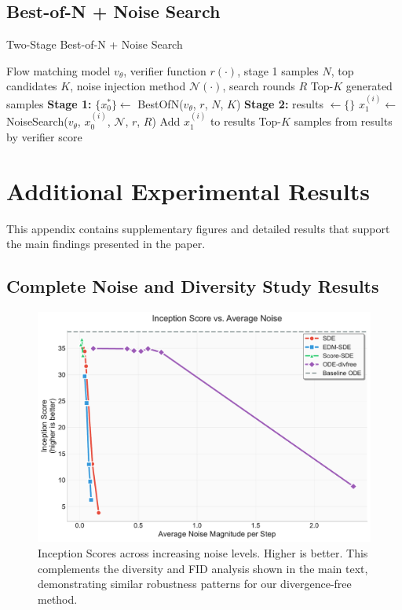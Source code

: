 \documentclass{article}
\begin{document}
\subsection{Best-of-N + Noise Search}

\begin{algorithm}[H]
\caption{Two-Stage Best-of-N + Noise Search}
\label{alg:best-of-n-noise-search}
\begin{algorithmic}[1]
\Require Flow matching model $v_\theta$, verifier function $r(\cdot)$, stage 1 samples $N$, top candidates $K$, noise injection method $\mathcal{N}(\cdot)$, search rounds $R$
\Ensure Top-$K$ generated samples
\State \textbf{Stage 1:} $\{x_0^*\} \leftarrow$ BestOfN($v_\theta$, $r$, $N$, $K$) 
\State \textbf{Stage 2:} results $\leftarrow \{\}$
    \State $x_1^{(i)} \leftarrow$ NoiseSearch($v_\theta$, $x_0^{(i)}$, $\mathcal{N}$, $r$, $R$) 
    \State Add $x_1^{(i)}$ to results
\EndFor
\State \Return Top-$K$ samples from results by verifier score
\end{algorithmic}
\end{algorithm}

\section{Additional Experimental Results}

This appendix contains supplementary figures and detailed results that support the main findings presented in the paper.

\subsection{Complete Noise and Diversity Study Results}

\begin{figure}[H]
  \centering
  \includegraphics[width=0.7\linewidth]{figures/noise_study_is.pdf}
  \caption{Inception Scores across increasing noise levels. Higher is better. This complements the diversity and FID analysis shown in the main text, demonstrating similar robustness patterns for our divergence-free method.}
  \label{fig:is-noise}
\end{figure}
\end{document}

